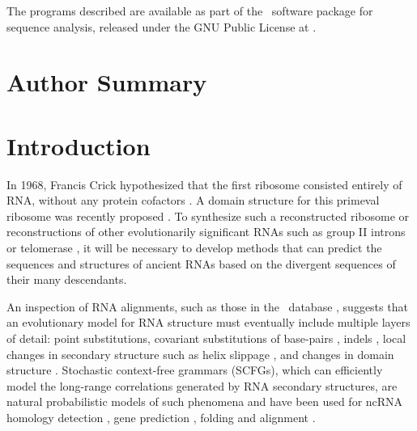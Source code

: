 \documentclass[10pt]{article}
\begin{document}
The programs described are available
as part of the \dart\ software package for sequence analysis,
released under the GNU Public License at
\darturl.


\newpage
\section*{Author Summary}


\newpage
\section*{Introduction}
In 1968, Francis Crick hypothesized that the first ribosome consisted entirely of RNA, without any protein cofactors \cite{Crick68}.
A domain structure for this primeval ribosome was recently proposed \cite{SmithEtAl2008}.
To synthesize such a reconstructed ribosome or reconstructions of other evolutionarily significant RNAs
such as group II introns \cite{LehmannSchmidt2003} or telomerase \cite{AntalEtAl2002},
it will be necessary to develop methods that can predict the sequences
and structures of ancient RNAs
based on the divergent sequences of their many descendants.

An inspection of RNA alignments, such as those in the \RFAM\ database
\cite{GriffithsJonesEtAl2003}, suggests that an evolutionary model for
RNA structure must eventually include multiple layers of detail: point
substitutions, covariant substitutions of base-pairs
\cite{HancockTautzDover88,LeontisEtAl2002}, indels
\cite{TakeshiTsutomu2008}, local changes in secondary structure such
as helix slippage \cite{HancockDover90}, and changes in domain
structure \cite{SmithEtAl2008}.  Stochastic context-free grammars
(SCFGs), which can efficiently model the long-range correlations
generated by RNA secondary structures, are natural probabilistic models of such
phenomena and have been used for ncRNA homology detection
\cite{Eddy94,Durbin98,KleinEddy2003,NawrockiEddy2007}, gene prediction
\cite{RivasEddy99,PedersenEtAl2006}, folding
\cite{KnudsenHein2003,DowellEddy2004} and alignment
\cite{Holmes2005,DowellEddy2006,BradleyPachterHolmes2008}.
\end{document}
